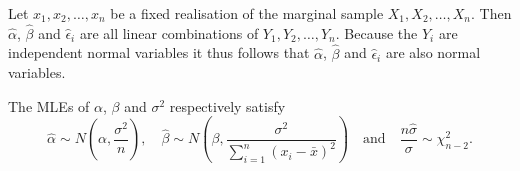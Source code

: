 
\bigskip
Let $x_1,x_2,\ldots,x_n$ be a fixed realisation of the marginal sample $X_1,X_2,\ldots,X_n$. Then $\hat{\alpha}$, $\hat{\beta}$ and $\hat{\epsilon}_i$ are all linear combinations of $Y_1,Y_2,\ldots,Y_n$. Because the $Y_i$ are independent normal variables it thus follows that $\hat{\alpha}$, $\hat{\beta}$ and $\hat{\epsilon}_i$ are also normal variables.

\begin{theorem}
The MLEs of $\alpha$, $\beta$ and $\sigma^2$ respectively satisfy
\[
\hat{\alpha} \sim N\left(\alpha,\frac{\sigma^2}{n}\right),
\quad
\hat{\beta} \sim N\left(\beta,\frac{\sigma^2}{\sum_{i=1}^n(x_i-\bar{x})^2}\right)
\quad\text{and}\quad
\frac{n\hat{\sigma}}{\sigma} \sim \chi^2_{n-2}.
\]
\end{theorem}


